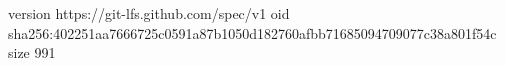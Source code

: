 version https://git-lfs.github.com/spec/v1
oid sha256:402251aa7666725c0591a87b1050d182760afbb71685094709077c38a801f54c
size 991

